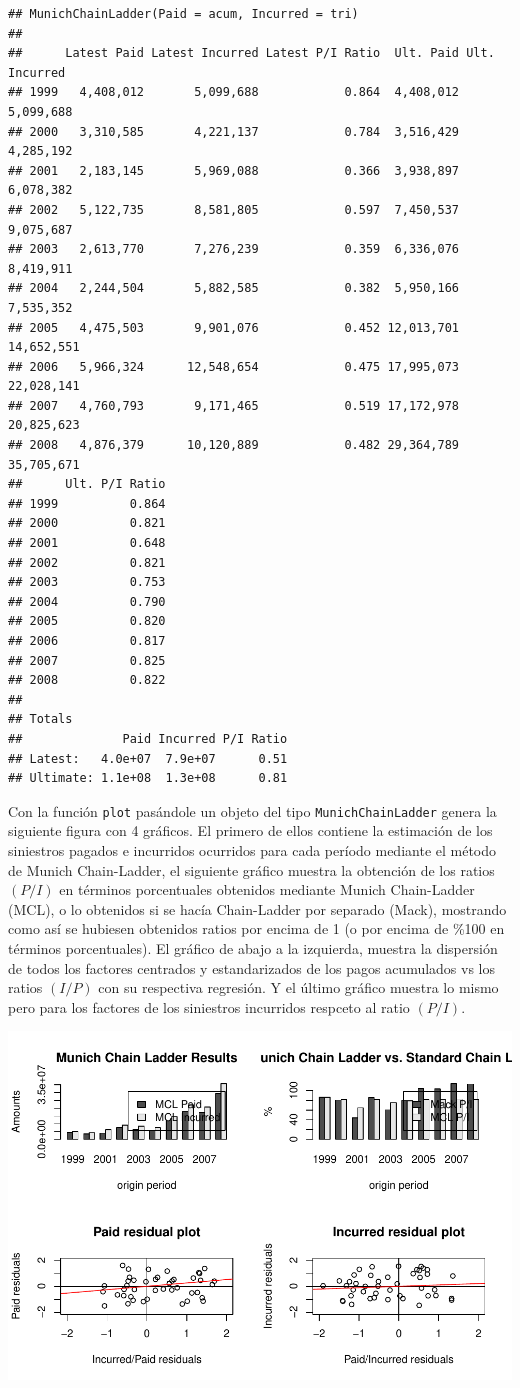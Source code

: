 \documentclass[
  12pt,
]{article}
\begin{document}
\begin{verbatim}
## MunichChainLadder(Paid = acum, Incurred = tri)
## 
##      Latest Paid Latest Incurred Latest P/I Ratio  Ult. Paid Ult. Incurred
## 1999   4,408,012       5,099,688            0.864  4,408,012     5,099,688
## 2000   3,310,585       4,221,137            0.784  3,516,429     4,285,192
## 2001   2,183,145       5,969,088            0.366  3,938,897     6,078,382
## 2002   5,122,735       8,581,805            0.597  7,450,537     9,075,687
## 2003   2,613,770       7,276,239            0.359  6,336,076     8,419,911
## 2004   2,244,504       5,882,585            0.382  5,950,166     7,535,352
## 2005   4,475,503       9,901,076            0.452 12,013,701    14,652,551
## 2006   5,966,324      12,548,654            0.475 17,995,073    22,028,141
## 2007   4,760,793       9,171,465            0.519 17,172,978    20,825,623
## 2008   4,876,379      10,120,889            0.482 29,364,789    35,705,671
##      Ult. P/I Ratio
## 1999          0.864
## 2000          0.821
## 2001          0.648
## 2002          0.821
## 2003          0.753
## 2004          0.790
## 2005          0.820
## 2006          0.817
## 2007          0.825
## 2008          0.822
## 
## Totals
##              Paid Incurred P/I Ratio
## Latest:   4.0e+07  7.9e+07      0.51
## Ultimate: 1.1e+08  1.3e+08      0.81
\end{verbatim}

Con la función \texttt{plot} pasándole un objeto del tipo
\texttt{MunichChainLadder} genera la siguiente figura con 4 gráficos. El
primero de ellos contiene la estimación de los siniestros pagados e
incurridos ocurridos para cada período mediante el método de Munich
Chain-Ladder, el siguiente gráfico muestra la obtención de los ratios
\((P/I)\) en términos porcentuales obtenidos mediante Munich
Chain-Ladder (MCL), o lo obtenidos si se hacía Chain-Ladder por separado
(Mack), mostrando como así se hubiesen obtenidos ratios por encima de 1
(o por encima de \%100 en términos porcentuales). El gráfico de abajo a
la izquierda, muestra la dispersión de todos los factores centrados y
estandarizados de los pagos acumulados vs los ratios \((I/P)\) con su
respectiva regresión. Y el último gráfico muestra lo mismo pero para los
factores de los siniestros incurridos respceto al ratio \((P/I)\).

\includegraphics{informe_files/figure-latex/unnamed-chunk-29-1.pdf}
\end{document}
